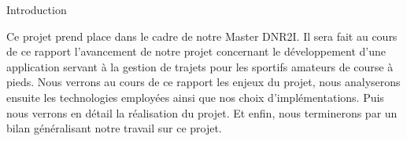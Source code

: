 {\Huge{Introduction}}

\vspace{2cm}
Ce projet prend place dans le cadre de notre Master DNR2I. Il sera fait au cours de ce rapport l'avancement de notre projet concernant le développement d'une application servant à la gestion de trajets pour les sportifs amateurs de course à pieds. Nous verrons au cours de ce rapport les enjeux du projet, nous analyserons ensuite les technologies employées ainsi que nos choix d'implémentations. Puis nous verrons en détail la réalisation du projet. Et enfin, nous terminerons par un bilan généralisant notre travail sur ce projet.